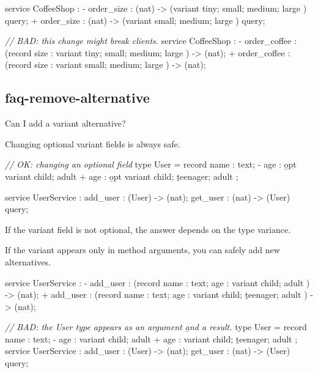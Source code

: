 \documentclass{article}
\begin{document}
\begin{code}[good]
 service CoffeeShop : {
-  order_size : (nat) -> (variant { tiny; small; medium; large }) query;
+  order_size : (nat) -> (variant {       small; medium; large }) query;
 }
\end{code}

\begin{code}[bad]
 \emph{// BAD: this change might break clients.}
 service CoffeeShop : {
-  order_coffee : (record { size : variant { tiny; small; medium; large } }) -> (nat);
+  order_coffee : (record { size : variant {       small; medium; large } }) -> (nat);
 }
\end{code}

\subsection{faq-remove-alternative}{Can I add a variant alternative?}

Changing optional variant fields is always safe.

\begin{code}[good]
 \emph{// OK: changing an optional field}
 type User = record {
   name : text;
-  age : \b{opt} variant { child;           adult }
+  age : \b{opt} variant { child; \b{teenager;} adult }
};

 service UserService : {
   add_user : (User) -> (nat);
   get_user : (nat) -> (User) query;
 }
\end{code}

If the variant field is not optional, the answer depends on the type variance.

If the variant appears only in method arguments, you can safely add new alternatives.

\begin{code}[good]
 service UserService : {
-  add_user : (record { name : text;  age : variant { child;           adult }}) -> (nat);
+  add_user : (record { name : text;  age : variant { child; \b{teenager}; adult }}) -> (nat);
 }
\end{code}

\begin{code}[bad]
\emph{// BAD: the User type appears as an argument \b{and} a result.}
 type User = record {
   name : text;
-  age : variant { child;           adult }
+  age : variant { child; \b{teenager;} adult }
 };
 service UserService : {
   add_user : (User) -> (nat);
   get_user : (nat) -> (User) query;
 }
\end{code}
\end{document}
